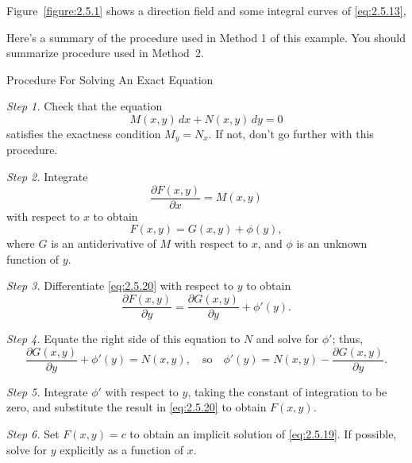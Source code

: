 \documentclass{ximera}
\begin{document}
\begin{example}
\begin{explanation}
Figure~\ref{figure:2.5.1} shows a direction field and  some
integral curves of \eqref{eq:2.5.13},

\begin{center}
\end{center}

\end{explanation}
\end{example}
 
 
Here's a summary of the procedure used in Method 1 of this
example. You should summarize procedure used in Method~2.
 
 
Procedure For Solving An Exact
Equation
 
 
\begin{procedure}\label{proc:solvingExactEq}
 
\textit{Step 1.} Check that the equation
\begin{equation} \label{eq:2.5.19}
 M(x,y)\,dx+N(x,y)\,dy=0
\end{equation}
satisfies the exactness condition  $M_y=N_x$. If not,
don't go further with this procedure.
 
\textit{Step 2.} Integrate
$$
\frac{\partial F(x,y)}{\partial x}=M(x,y)
$$
with respect to $x$ to obtain
\begin{equation} \label{eq:2.5.20}
F(x,y)=G(x,y)+\phi(y),
\end{equation}
where $G$ is an antiderivative of $M$ with respect to $x$, and $\phi$
is an unknown function of $y$.
 
\textit{Step 3.} Differentiate \eqref{eq:2.5.20} with respect to
$y$  to obtain
$$
\frac{\partial F(x,y)}{\partial y}=\frac{\partial G(x,y)}{\partial
y}+\phi'(y).
$$
 
\textit{Step 4.} Equate the right side of this equation to $N$ and solve
for $\phi'$;    thus,
$$
 \frac{\partial G(x,y)}{\partial y}+\phi'(y)=N(x,y),\quad\text{so}\quad
\phi'(y)=N(x,y)-\frac{\partial G(x,y)}{\partial y}.
$$
 
\textit{Step 5.} Integrate $\phi'$ with respect to $y$, taking the
constant of integration to be zero, and substitute the result in
\eqref{eq:2.5.20} to obtain $F(x,y)$.
 
\textit{Step 6.} Set $F(x,y)=c$ to obtain an implicit solution of
\eqref{eq:2.5.19}. If possible, solve for $y$ explicitly as a
function of $x$.
 
\end{procedure}
 
\end{document}
